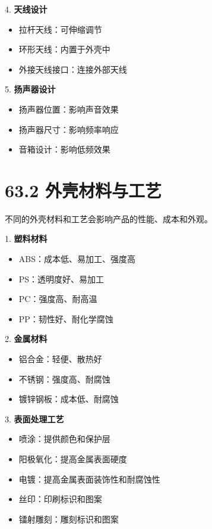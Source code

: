 \documentclass[12pt,UTF8]{ctexbook}
\begin{document}
4. \textbf{天线设计}
   \begin{itemize}[leftmargin=3.5em]
   \item 拉杆天线：可伸缩调节
   \item 环形天线：内置于外壳中
   \item 外接天线接口：连接外部天线
   \end{itemize}

5. \textbf{扬声器设计}
   \begin{itemize}[leftmargin=3.5em]
   \item 扬声器位置：影响声音效果
   \item 扬声器尺寸：影响频率响应
   \item 音箱设计：影响低频效果
   \end{itemize}

\section*{63.2 外壳材料与工艺}

不同的外壳材料和工艺会影响产品的性能、成本和外观。

1. \textbf{塑料材料}
   \begin{itemize}[leftmargin=3.5em]
   \item ABS：成本低、易加工、强度高
   \item PS：透明度好、易加工
   \item PC：强度高、耐高温
   \item PP：韧性好、耐化学腐蚀
   \end{itemize}

2. \textbf{金属材料}
   \begin{itemize}[leftmargin=3.5em]
   \item 铝合金：轻便、散热好
   \item 不锈钢：强度高、耐腐蚀
   \item 镀锌钢板：成本低、耐腐蚀
   \end{itemize}

3. \textbf{表面处理工艺}
   \begin{itemize}[leftmargin=3.5em]
   \item 喷涂：提供颜色和保护层
   \item 阳极氧化：提高金属表面硬度
   \item 电镀：提高金属表面装饰性和耐腐蚀性
   \item 丝印：印刷标识和图案
   \item 镭射雕刻：雕刻标识和图案
   \end{itemize}
\end{document}
